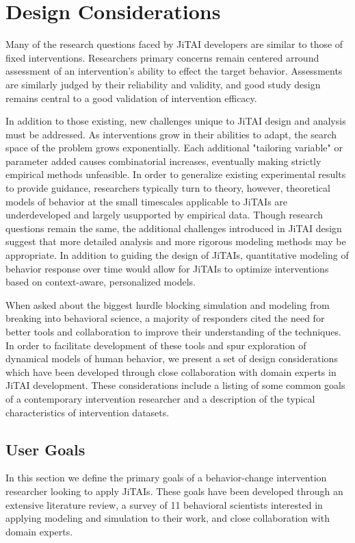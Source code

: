 \section{Design Considerations}
Many of the research questions faced by JiTAI developers are similar to those of fixed interventions. 
Researchers primary concerns remain centered arround assessment of an intervention's ability to effect the target behavior.
Assessments are similarly judged by their reliability and validity, and good study design remains central to a good validation of intervention efficacy.

In addition to those existing, new challenges unique to JiTAI design and analysis must be addressed.
As interventions grow in their abilities to adapt, the search space of the problem grows exponentially.
Each additional "tailoring variable" or parameter added causes combinatorial increases, eventually making strictly empirical methods unfeasible.
In order to generalize existing experimental results to provide guidance, researchers typically turn to theory, however, theoretical models of behavior at the small timescales applicable to JiTAIs are underdeveloped and largely usupported by empirical data. 
Though research questions remain the same, the additional challenges introduced in JiTAI design suggest that more detailed analysis and more rigorous modeling methods may be appropriate.
In addition to guiding the design of JiTAIs, quantitative modeling of behavior response over time would allow for JiTAIs to optimize interventions based on context-aware, personalized models.

When asked about the biggest hurdle blocking simulation and modeling from breaking into behavioral science, a majority of responders cited the need for better tools and collaboration to improve their understanding of the techniques.
In order to facilitate development of these tools and spur exploration of dynamical models of human behavior, we present a set of design considerations which have been developed through close collaboration with domain experts in JiTAI development.
These considerations include a listing of some common goals of a contemporary intervention researcher and a description of the typical characteristics of intervention datasets. 

\subsection{User Goals}
In this section we define the primary goals of a behavior-change intervention researcher looking to apply JiTAIs.
These goals have been developed through an extensive literature review, a survey of 11 behavioral scientists interested in applying modeling and simulation to their work, and close collaboration with domain experts.

